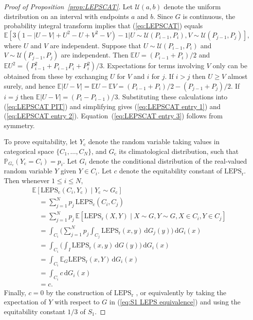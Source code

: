 \documentclass[10pt]{article} %
\theoremstyle{theorem}
\theoremstyle{definition}
\newcommand{\EEE}{\mathbb{E}}
\newcommand{\PPP}{\mathbb{P}}
\newcommand{\dd}{\mathrm{d}}
\newcommand{\LEPSr}{\mathrm{LEPS}_\mathrm{r}}
\newcommand{\LEPSc}{\mathrm{LEPS}_\mathrm{c}}
\begin{document}
\begin{proof}[Proof of Proposition~\ref{prop:LEPSCAT}]
Let $\mathcal{U}(a,b)$ denote the uniform distribution on an interval with endpoints $a$ and $b$. Since $G$ is continuous, the probability integral transform implies that (\ref{eq:LEPSCAT}) equals
\begin{equation}\label{eq:LEPSCAT PIT}
\EEE[3(1-|U-V| + U^2 - U + V^2 - V) - 1  | U\sim \mathcal{U}(P_{i-1},P_i), V\sim \mathcal{U}(P_{j-1},P_j)],
\end{equation}
where $U$ and $V$ are independent. Suppose that $U\sim \mathcal{U}(P_{i-1},P_i)$ and $V\sim \mathcal{U}(P_{j-1},P_j)$ are independent. Then $\EEE U=(P_{i-1}+P_i)/2$ and  $\EEE U^2=(P_{i-1}^2+P_{i-1} P_i+P_i^2)/3$. Expectations for terms involving $V$ only can be obtained from these by exchanging $U$ for $V$ and $i$ for $j$. 
If $i>j$ then $U \geq V$ almost surely, and hence $\EEE|U-V|=\EEE U - \EEE V = (P_{i-1}+P_i)/2 - (P_{j-1}+P_j)/2$. If $i=j$ then $\EEE|U-V|=(P_i-P_{i-1})/3$. 
Substituting these calculations into (\ref{eq:LEPSCAT PIT}) and simplifying gives (\ref{eq:LEPSCAT entry 1}) and (\ref{eq:LEPSCAT entry 2}). Equation~(\ref{eq:LEPSCAT entry 3}) follows from symmetry.

To prove equitability, let $Y_\mathrm{c}$ denote the random variable taking values in categorical space $\{C_1,\ldots,C_N\}$, and $G_\mathrm{c}$ its climatological distribution, such that $\PPP_{G_\mathrm{c}}(Y_\mathrm{c}=C_i)=p_i$. Let $G_i$ denote the conditional distribution of the real-valued random variable $Y$ given $Y\in C_i$. Let $c$ denote the equitability constant of $\LEPSr$. Then whenever $1\leq i\leq N$,
\begin{align*}
&\EEE [\LEPSc(C_i, Y_\mathrm{c}) \mid Y_\mathrm{c} \sim G_\mathrm{c}] \\
&\quad=\sum_{j=1}^N p_j\,\LEPSc(C_i, C_j) \\
&\quad=\sum_{j=1}^N p_j\,\EEE[\LEPSr(X,Y) \mid X\sim G, Y\sim G, X\in C_i, Y\in C_j] \\
&\quad=\int_{C_i} \Big(\sum_{j=1}^N p_j \int_{C_j} \LEPSr(x,y)\,\dd G_j(y) \Big) \,\dd G_i(x) \\
&\quad=\int_{C_i} \Big(\int_I \LEPSr(x,y)\,\dd G(y) \Big) \,\dd G_i(x) \\
&\quad=\int_{C_i} \EEE_G\LEPSr(x,Y) \,\dd G_i(x) \\
&\quad=\int_{C_i} c \,\dd G_i(x) \\
&\quad=c.
\end{align*}
Finally, $c=0$ by the construction of $\LEPSr$ \citep{potts1996revised}, or equivalently by taking the expectation of $Y$ with respect to $G$ in (\ref{eq:S1 LEPS equivalence}) and using the equitability constant $1/3$ of $S_1$.
\end{proof}
\end{document}

